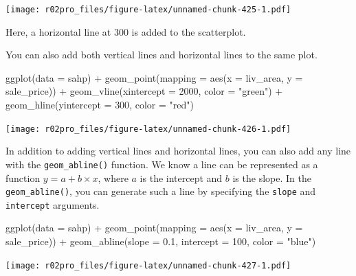\documentclass[
]{book}
\newenvironment{Shaded}{\begin{snugshade}}{\end{snugshade}}
\newcommand{\AttributeTok}[1]{\textcolor[rgb]{0.77,0.63,0.00}{#1}}
\newcommand{\DecValTok}[1]{\textcolor[rgb]{0.00,0.00,0.81}{#1}}
\newcommand{\FloatTok}[1]{\textcolor[rgb]{0.00,0.00,0.81}{#1}}
\newcommand{\FunctionTok}[1]{\textcolor[rgb]{0.00,0.00,0.00}{#1}}
\newcommand{\NormalTok}[1]{#1}
\newcommand{\SpecialCharTok}[1]{\textcolor[rgb]{0.00,0.00,0.00}{#1}}
\newcommand{\StringTok}[1]{\textcolor[rgb]{0.31,0.60,0.02}{#1}}
\begin{document}
\texttt{[image: r02pro\_files/figure-latex/unnamed-chunk-425-1.pdf]}

Here, a horizontal line at 300 is added to the scatterplot.

You can also add both vertical lines and horizontal lines to the same plot.

\begin{Shaded}
\begin{Highlighting}[]
\FunctionTok{ggplot}\NormalTok{(}\AttributeTok{data =}\NormalTok{ sahp) }\SpecialCharTok{+} \FunctionTok{geom\_point}\NormalTok{(}\AttributeTok{mapping =} \FunctionTok{aes}\NormalTok{(}\AttributeTok{x =}\NormalTok{ liv\_area, }\AttributeTok{y =}\NormalTok{ sale\_price)) }\SpecialCharTok{+} \FunctionTok{geom\_vline}\NormalTok{(}\AttributeTok{xintercept =} \DecValTok{2000}\NormalTok{, }\AttributeTok{color =} \StringTok{"green"}\NormalTok{) }\SpecialCharTok{+} \FunctionTok{geom\_hline}\NormalTok{(}\AttributeTok{yintercept =} \DecValTok{300}\NormalTok{, }\AttributeTok{color =} \StringTok{"red"}\NormalTok{)}
\end{Highlighting}
\end{Shaded}

\texttt{[image: r02pro\_files/figure-latex/unnamed-chunk-426-1.pdf]}

In addition to adding vertical lines and horizontal lines, you can also add any line with the \texttt{geom\_abline()} function. We know a line can be represented as a function \(y = a + b\times x\), where \(a\) is the intercept and \(b\) is the slope. In the \texttt{geom\_abline()}, you can generate such a line by specifying the \texttt{slope} and \texttt{intercept} arguments.

\begin{Shaded}
\begin{Highlighting}[]
\FunctionTok{ggplot}\NormalTok{(}\AttributeTok{data =}\NormalTok{ sahp) }\SpecialCharTok{+} \FunctionTok{geom\_point}\NormalTok{(}\AttributeTok{mapping =} \FunctionTok{aes}\NormalTok{(}\AttributeTok{x =}\NormalTok{ liv\_area, }\AttributeTok{y =}\NormalTok{ sale\_price)) }\SpecialCharTok{+} \FunctionTok{geom\_abline}\NormalTok{(}\AttributeTok{slope =} \FloatTok{0.1}\NormalTok{, }\AttributeTok{intercept =} \DecValTok{100}\NormalTok{, }\AttributeTok{color =} \StringTok{"blue"}\NormalTok{)}
\end{Highlighting}
\end{Shaded}

\texttt{[image: r02pro\_files/figure-latex/unnamed-chunk-427-1.pdf]}
\end{document}
